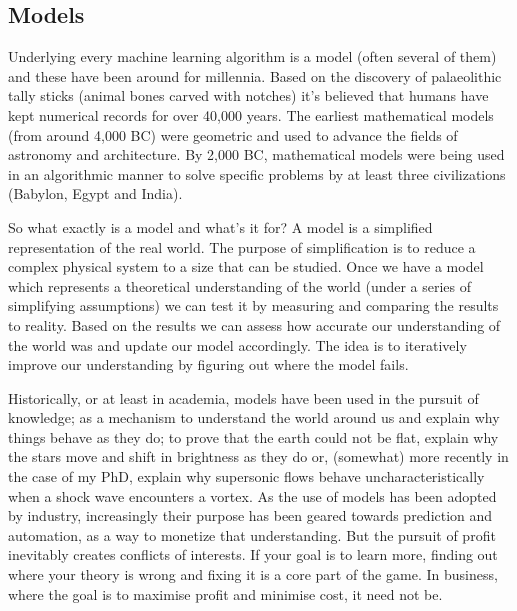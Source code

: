 \subsection{Models}

Underlying every machine learning algorithm is a model (often several of them) and these have been around for millennia. Based on the discovery of palaeolithic tally sticks (animal bones carved with notches) it's believed that humans have kept numerical records for over 40,000 years. The earliest mathematical models (from around 4,000 BC) were geometric and used to advance the fields of astronomy and architecture. By 2,000 BC, mathematical models were being used in an algorithmic manner to solve specific problems by at least three civilizations (Babylon, Egypt and India).

So what exactly is a model and what's it for? A model is a simplified representation of the real world. The purpose of simplification is to reduce a complex physical system to a size that can be studied. Once we have a model which represents a theoretical understanding of the world (under a series of simplifying assumptions) we can test it by measuring and comparing the results to reality. Based on the results we can assess how accurate our understanding of the world was and update our model accordingly. The idea is to iteratively improve our understanding by figuring out where the model fails.

Historically, or at least in academia, models have been used in the pursuit of knowledge; as a mechanism to understand the world around us and explain why things behave as they do; to prove that the earth could not be flat, explain why the stars move and shift in brightness as they do or, (somewhat) more recently in the case of my PhD, explain why supersonic flows behave uncharacteristically when a shock wave encounters a vortex. As the use of models has been adopted by industry, increasingly their purpose has been geared towards prediction and automation, as a way to monetize that understanding. But the pursuit of profit inevitably creates conflicts of interests. If your goal is to learn more, finding out where your theory is wrong and fixing it is a core part of the game. In business, where the goal is to maximise profit and minimise cost, it need not be.


